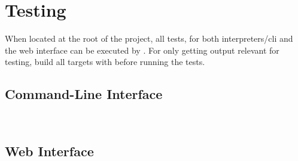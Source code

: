 \section{Testing}

When located at the root of the project, all tests, for both interpreters/cli and the web interface can be executed by . For only getting output relevant for testing, build all targets with  before running the tests.

\subsection{Command-Line Interface}
\\

\subsection{Web Interface}
\\
\\
